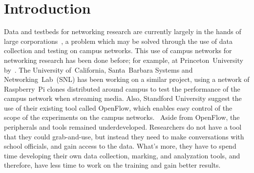 \section{Introduction}\label{introduction}
    Data and testbeds for networking research are currently largely in the hands of large corporations~\autocite{GuptaArpit2019AEtD}, a problem which may be solved through the use of data collection and testing on campus networks. This use of campus networks for networking research has been done before; for example, at Princeton~University by~\textcite{KimHyojoon2021Erop}. The University of~California, Santa~Barbara Systems and Networking~Lab~(SNL) has been working on a similar project, using a network of Raspberry~Pi clones distributed around campus to test the performance of the campus network when streaming media. Also, Standford University suggest the use of their existing tool called OpenFlow, which enables easy control of the scope of the experiments on the campus networks.~\autocite{10.1145/1355734.1355746} Aside from OpenFlow, the peripherals and tools remained underdeveloped. Researchers do not have a tool that they could grab-and-use, but instead they need to make conversations with school officials, and gain access to the data. What's more, they have to spend time developing their own data collection, marking, and analyzation tools, and therefore, have less time to work on the training and gain better results.
